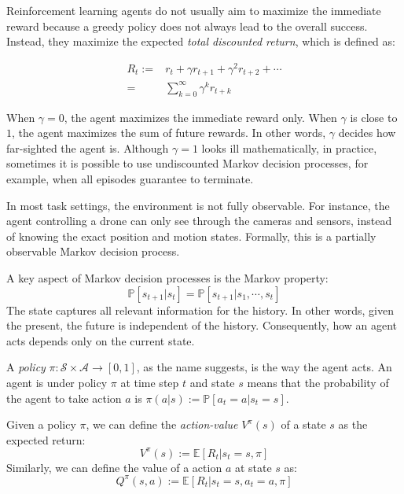         Reinforcement learning agents do not usually aim to maximize the immediate reward
        because a greedy policy does not always lead to the overall success.
        Instead, they maximize the expected \emph{total discounted return}, which is defined as:

        \begin{align*}
            R_t :=& r_{t} + \gamma r_{t+1} + \gamma^2 r_{t+2} + \cdots \\
            =& \sum_{k=0}^{\infty} \gamma^k r_{t+k}
        \end{align*}

        When $\gamma=0$, the agent maximizes the immediate reward only.
        When $\gamma$ is close to $1$, the agent maximizes the sum of future rewards.
        In other words, $\gamma$ decides how far-sighted the agent is.
        Although $\gamma=1$ looks ill mathematically,
        in practice, sometimes it is possible to use undiscounted Markov decision processes,
        for example, when all episodes guarantee to terminate.

        In most task settings, the environment is not fully observable.
        For instance, the agent controlling a drone can only see through the cameras and sensors,
        instead of knowing the exact position and motion states.
        Formally, this is a partially observable Markov decision process.

        A key aspect of Markov decision processes is the Markov property:
        \[
        \mathbb{P}[s_{t+1} | s_t] = \mathbb{P}[s_{t+1} | s_1, \cdots, s_t] 
        \]
        The state captures all relevant information for the history.
        In other words, given the present, the future is independent of the history.
        Consequently, how an agent acts depends only on the current state.

        A \emph{policy} $\pi : \mathcal{S} \times \mathcal{A} \rightarrow [0,1]$,
        as the name suggests, is the way the agent acts.
        An agent is under policy $\pi$ at time step $t$ and state $s$ means that
        the probability of the agent to take action $a$ is
        $\pi(a|s) := \mathbb{P}[a_t=a | s_t=s]$.

        Given a policy $\pi$, we can define the \emph{action-value} $V^{\pi}(s)$ of a state $s$ as
        the expected return:
        \[ V^{\pi}(s) :=  \mathbb{E}[R_t | s_t=s, \pi] \]
        Similarly, we can define the value of a action $a$ at state $s$ as:
        \[ Q^{\pi}(s,a) := \mathbb{E}[R_t | s_t=s, a_t=a, \pi] \]

